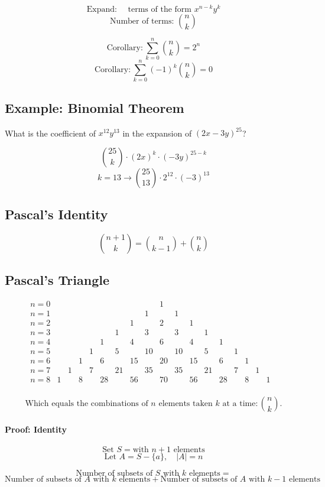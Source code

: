 \documentclass[11pt]{article}
\begin{document}
\[
\text{Expand: } \quad \text{terms of the form } x^{n-k} y^k
\]
\[
\text{Number of terms: } \binom{n}{k}
\]

\[
\text{Corollary}:  \sum_{k=0}^{n} \binom{n}{k} = 2^n
\]
\[
\text{Corollary}:  \sum_{k=0}^{n} (-1)^k \binom{n}{k} = 0
\]

\subsection*{Example: Binomial Theorem}
What is the coefficient of $x^{12} y^{13}$ in the expansion of $(2x - 3y)^{25}$?

\[
\binom{25}{k} \cdot (2x)^{k} \cdot (-3y)^{25-k}
\]
\[
k = 13 \rightarrow \binom{25}{13} \cdot 2^{12} \cdot (-3)^{13}
\]

\subsection{Pascal's Identity}
\[
\binom{n + 1}{k} = \binom{n}{k-1} + \binom{n}{k}
\]

\subsection*{Pascal's Triangle}
\[
\begin{array}{cccccccccccccccccccc}
n=0&&&&&&&&&1&&&&&&&&&\\
n=1&&&&&&&&1&&1&&&&&&&\\
n=2&&&&&&&1&&2&&1&&&&&&\\
n=3&&&&&&1&&3&&3&&1&&&&&\\
n=4&&&&&1&&4&&6&&4&&1&&&&\\
n=5&&&&1&&5&&10&&10&&5&&1&&&\\
n=6&&&1&&6&&15&&20&&15&&6&&1&&\\
n=7&&1&&7&&21&&35&&35&&21&&7&&1&\\
n=8&1&&8&&28&&56&&70&&56&&28&&8&&1\\
\end{array}
\]

\[
\text{Which equals the combinations of $n$ elements taken $k$ at a time}: \binom{n}{k}.
\]

\paragraph{Proof: Identity}

\[
\text{Set } S = \text{with } n + 1 \text{ elements}
\]
\[
\text{Let } A = S - \{a\}, \quad |A| = n
\]

\[
\text{Number of subsets of } S \text{ with } k \text{ elements} = 
\]
\[
\text{Number of subsets of } A \text{ with } k \text{ elements} + \text{Number of subsets of } A \text{ with } k - 1 \text{ elements}
\]
\end{document}
